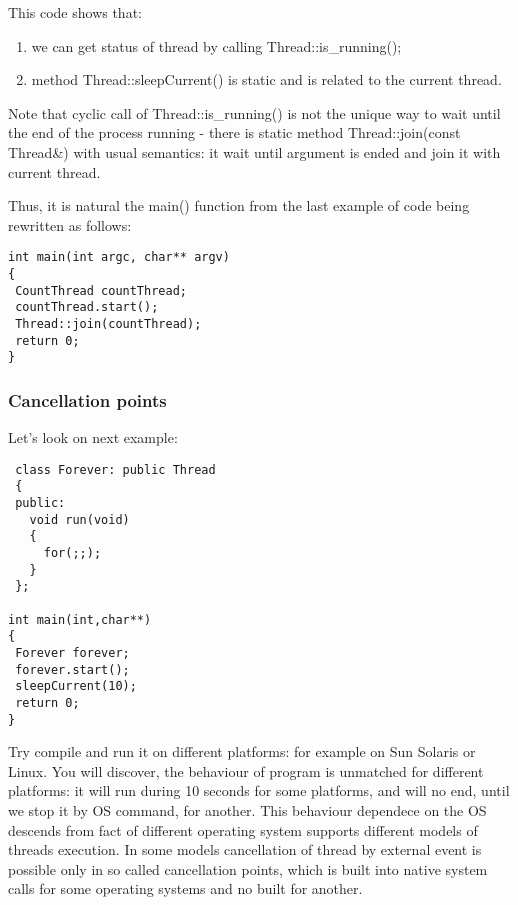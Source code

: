 \documentclass[10pt]{article}
\begin{document}
 This code shows that:
 \begin{enumerate}
 \item we can get status of thread by calling Thread::is\_running();
 \item method Thread::sleepCurrent() is static and is related to the current thread.
 \end{enumerate}
 Note that cyclic call of Thread::is\_running() is not the unique way
 to wait until the end of the process running -
 there is static method Thread::join(const Thread\&) with usual semantics:
 it wait until argument is ended and join it with current thread.

 Thus, it is natural the main() function from the last example of code being rewritten as follows:
\begin{verbatim}
int main(int argc, char** argv)
{
 CountThread countThread;
 countThread.start();
 Thread::join(countThread);
 return 0;
}
\end{verbatim}


\subsubsection{ Cancellation points }

 Let's look on next example:

\begin{verbatim}
 class Forever: public Thread
 {
 public:
   void run(void)
   {
     for(;;);
   }
 };

int main(int,char**)
{
 Forever forever;
 forever.start();
 sleepCurrent(10);
 return 0;
}
\end{verbatim}

 Try compile and run it on different platforms: for example on
Sun Solaris or Linux.
You will discover, the behaviour of program is unmatched for different platforms:
it will run during 10 seconds for some platforms, 
and will no end, until we stop it by OS command, for another.
This behaviour dependece on the OS descends from fact of
different operating system supports different models of threads execution.
In some models cancellation of thread by external event is
possible only in so called cancellation points, which is built into
native system calls for some operating systems and no built for another.
\end{document}
